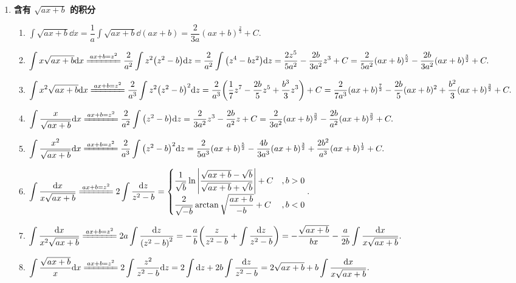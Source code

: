 \begin{enumerate}[label=\arabic{*}.]
\begin{enumerate}[label=\roman{*}.]
          \end{enumerate}
    \item \textbf{含有 $\sqrt{ax+b}$ 的积分}
          \begin{enumerate}[label=\roman{*}.]
              \item $\displaystyle\int\sqrt{ax+b}\dd x=\dfrac{1}{a}\int\sqrt{ax+b}\dd (ax+b)=\dfrac{2}{3a}(ax+b)^{\frac{2}{3}}+C.$
              \item $\displaystyle \int x\sqrt{ax+b}\dd x \xlongequal{ax+b=z^2}\dfrac{2}{a^2}\int z^2\qty(z^2-b)\dd z=\dfrac{2}{a^2}\int\qty(z^4-bz^2)\dd z=\dfrac{2z^5}{5a^2}-\dfrac{2b}{3a^2}z^3+C=\dfrac{2}{5a^2}(ax+b)^{\frac{5}{2}}-\dfrac{2b}{3a^2}(ax+b)^{\frac{3}{2}}+C.$
              \item $\displaystyle \int x^2\sqrt{ax+b}\dd x \xlongequal{ax+b=z^2}\dfrac{2}{a^3}\int z^2\qty(z^2-b)^2\dd z=\dfrac{2}{a^3}\qty(\dfrac{1}{7}z^7-\dfrac{2b}{5}z^5+\dfrac{b^3}{3}z^3)+C=\dfrac{2}{7a^3}(ax+b)^{\frac{7}{2}}-\dfrac{2b}{5}(ax+b)^2+\dfrac{b^2}{3}(ax+b)^{\frac{3}{2}}+C.$
              \item $\displaystyle \int\dfrac{x}{\sqrt{ax+b}}\dd x \xlongequal{ax+b=z^2}\dfrac{2}{a^2}\int\qty(z^2-b)\dd z=\dfrac{2}{3a^2}z^3-\dfrac{2b}{a^2}z+C=\dfrac{2}{3a^2}(ax+b)^{\frac{3}{2}}-\dfrac{2b}{a^2}(ax+b)^{\frac{3}{2}}+C.$
              \item $\displaystyle \int\dfrac{x^2}{\sqrt{ax+b}}\dd x \xlongequal{ax+b=z^2}\dfrac{2}{a^3}\int\qty(z^2-b)^2\dd z=\dfrac{2}{5a^3}(ax+b)^{\frac{5}{2}}-\dfrac{4b}{3a^3}(ax+b)^{\frac{3}{2}}+\dfrac{2b^2}{a^3}(ax+b)^{\frac{1}{2}}+C.$
              \item $\displaystyle \int\dfrac{\dd x}{x\sqrt{ax+b}} \xlongequal{ax+b=z^2}2\int\dfrac{\dd z}{z^2-b}=\begin{cases}
                            \dfrac{1}{\sqrt{b}}\ln\qty|\dfrac{\sqrt{ax+b}-\sqrt{b}}{\sqrt{ax+b}+\sqrt{b}}|+C & ,b>0 \\[6pt]
                            \dfrac{2}{\sqrt{-b}}\arctan\sqrt{\dfrac{ax+b}{-b}}+C                             & ,b<0
                        \end{cases}.$
              \item $\displaystyle \int\dfrac{\dd x}{x^2\sqrt{ax+b}} \xlongequal{ax+b=z^2}2a\int\dfrac{\dd z}{\qty(z^2-b)^2}=-\dfrac{a}{b}\qty(\dfrac{z}{z^2-b}+\int\dfrac{\dd z}{z^2-b})=-\dfrac{\sqrt{ax+b}}{bx}-\dfrac{a}{2b}\int\dfrac{\dd x}{x\sqrt{ax+b}}.$
              \item $\displaystyle \int\dfrac{\sqrt{ax+b}}{x}\dd x \xlongequal{ax+b=z^2}2\int\dfrac{z^2}{z^2-b}\dd z=2\int\dd z+2b\int\dfrac{\dd z}{z^2-b}=2\sqrt{ax+b}+b\int\dfrac{\dd x}{x\sqrt{ax+b}}.$

\end{enumerate}
\end{enumerate}
